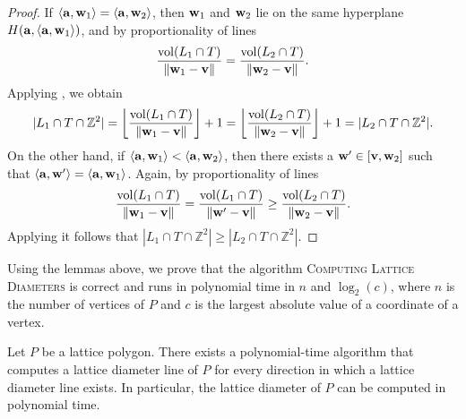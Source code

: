 \begin{proof}
    If $\langle \mathbf{a}, \mathbf{w}_1 \rangle = \langle \mathbf{a}, \mathbf{w}_2 \rangle$, then $\mathbf{w}_1$ and $\mathbf{w}_2$ lie on the same hyperplane $H(\mathbf{a}, \langle \mathbf{a}, \mathbf{w}_1 \rangle)$, and by  proportionality of lines 
\[
\frac{\operatorname{vol}(L_1 \cap T)}{\|\mathbf{w}_1- \mathbf{v}\|} = \frac{\operatorname{vol}(L_2 \cap T)}{\|\mathbf{w}_2- \mathbf{v}\|}.
\]
Applying , we obtain
\[
|L_1 \cap T \cap \mathbb{Z}^2| = \left\lfloor \frac{\operatorname{vol}(L_1 \cap T)}{\|\mathbf{w}_1- \mathbf{v}\|} \right\rfloor + 1= \left\lfloor \frac{\operatorname{vol}(L_2 \cap T)}{\|\mathbf{w}_2- \mathbf{v}\|} \right\rfloor + 1 = |L_2 \cap T \cap \mathbb{Z}^2|.
\]
On the other hand, if $\langle \mathbf{a}, \mathbf{w}_1 \rangle < \langle \mathbf{a}, \mathbf{w}_2 \rangle$, then there exists a $\mathbf{w}' \in [\mathbf{v}, \mathbf{w}_2]$ such that $\langle \mathbf{a}, \mathbf{w}' \rangle = \langle \mathbf{a}, \mathbf{w}_1 \rangle$. Again, by proportionality of lines
\[
\frac{\operatorname{vol}(L_1 \cap T)}{\|\mathbf{w}_1- \mathbf{v}\|} = \frac{\operatorname{vol}(L_1 \cap T)}{\|\mathbf{w}'- \mathbf{v}\|} \geq \frac{\operatorname{vol}(L_2 \cap T)}{\|\mathbf{w}_2- \mathbf{v}\|}.
\]
Applying  it follows that $|L_1 \cap T \cap \mathbb{Z}^2| \geq |L_2 \cap T \cap \mathbb{Z}^2|$.
\end{proof}


Using the lemmas above, we prove that the algorithm \textsc{Computing Lattice Diameters} is correct and runs in polynomial time in $n$ and $\log_2(c)$, where $n$ is the number of vertices of $P$ and $c$ is the largest absolute value of a coordinate of a vertex.

\begin{theorem}\label{thm:LD-poly}
     Let $P$ be a lattice polygon. There exists a polynomial-time algorithm that computes a lattice diameter line of $P$ for every direction in which a lattice diameter line exists. In particular, the lattice diameter of $P$ can be computed in polynomial time.
\end{theorem}

